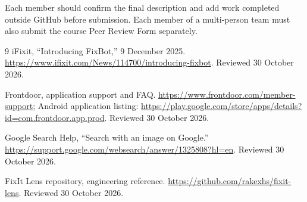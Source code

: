 \documentclass[10.5pt,a4paper]{article}
\begin{document}
Each member should confirm the final description and add work completed outside GitHub before submission. Each member of a multi-person team must also submit the course Peer Review Form separately.

\begin{thebibliography}{9}
iFixit, ``Introducing FixBot,'' 9 December 2025. \url{https://www.ifixit.com/News/114700/introducing-fixbot}. Reviewed 30 October 2026.

Frontdoor, application support and FAQ. \url{https://www.frontdoor.com/member-support}; Android application listing: \url{https://play.google.com/store/apps/details?id=com.frontdoor.app.prod}. Reviewed 30 October 2026.

Google Search Help, ``Search with an image on Google.'' \url{https://support.google.com/websearch/answer/1325808?hl=en}. Reviewed 30 October 2026.

FixIt Lens repository, engineering reference. \url{https://github.com/rakexhs/fixit-lens}. Reviewed 30 October 2026.
\end{thebibliography}
\end{document}
